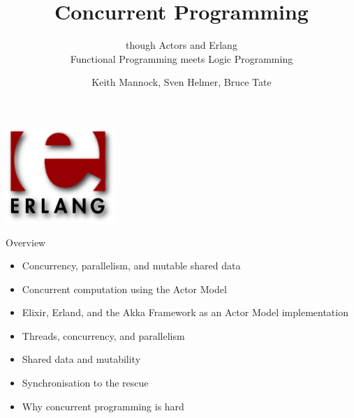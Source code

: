 \documentclass[12pt,xcolor=svgnames]{beamer}
\begin{document}
\title{Concurrent Programming}
\subtitle{though Actors and Erlang\\
Functional Programming meets Logic Programming}
\author{Keith Mannock, Sven Helmer, Bruce Tate}
\begin{frame}[plain] 
  \titlepage
  \centerline{\includegraphics[scale=0.9]{images/erlang-logo.png}}
  \end{frame}
  
\begin{frame}{Overview}
\begin{itemize}
\item Concurrency, parallelism, and mutable shared data
\item Concurrent computation using the Actor Model
\item Elixir, Erland, and the Akka Framework as an Actor Model implementation	
\end{itemize}

\framebreak

\begin{itemize}
\item Threads, concurrency, and parallelism
\item Shared data and mutability
\item Synchronisation to the rescue
\item Why concurrent programming is hard	
\end{itemize}

\end{frame}
\end{document}

